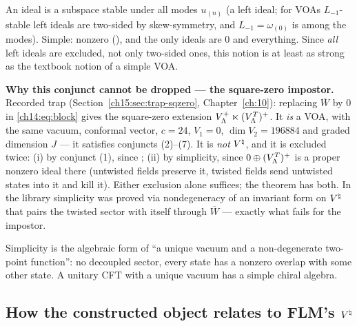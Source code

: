 \begin{dictionary}
An ideal is a subspace stable under all modes $u_{(n)}$ (a left ideal; for VOAs $L_{-1}$-stable left ideals
are two-sided by skew-symmetry, and $L_{-1}=\omega_{(0)}$ is among the modes).  Simple: nonzero
(), and the only ideals are $0$ and everything.  Since \emph{all} left ideals are excluded, not
only two-sided ones, this notion is at least as strong as the textbook notion of a simple VOA.

\textbf{Why this conjunct cannot be dropped — the square-zero impostor.}  Recorded trap (Section~\ref{ch15:sec:trap-sqzero},
Chapter~\ref{ch:10}): replacing $\overline W$ by $0$ in \eqref{ch14:eq:block} gives the square-zero
extension $V_{\Lambda}^+\ltimes(V_{\Lambda}^T)^+$.  It \emph{is} a VOA, with the same vacuum, conformal vector,
$c=24$, $V_1=0$, $\dim V_2=196884$ and graded dimension $J$ — it satisfies conjuncts (2)--(7).  It is
\emph{not} ${V^{\natural}}$, and it is excluded twice: (i) by conjunct (1), since ; (ii) by simplicity,
since $0\oplus(V_{\Lambda}^T)^+$ is a proper nonzero ideal there (untwisted fields preserve it, twisted fields
send untwisted states into it and kill it).  Either exclusion alone suffices; the theorem has both.
In the library simplicity was proved via nondegeneracy of an invariant form on ${V^{\natural}}$ that pairs the twisted
sector with itself through $\overline W$ — exactly what fails for the impostor.
\end{dictionary}

\begin{physics}
Simplicity is the algebraic form of ``a unique vacuum and a non-degenerate two-point function'': no
decoupled sector, every state has a nonzero overlap with some other state.  A unitary CFT with a
unique vacuum has a simple chiral algebra.
\end{physics}

\subsection{\texorpdfstring{How the constructed object relates to FLM's ${V^{\natural}}$}{How the constructed object relates to FLM's V-natural}}

